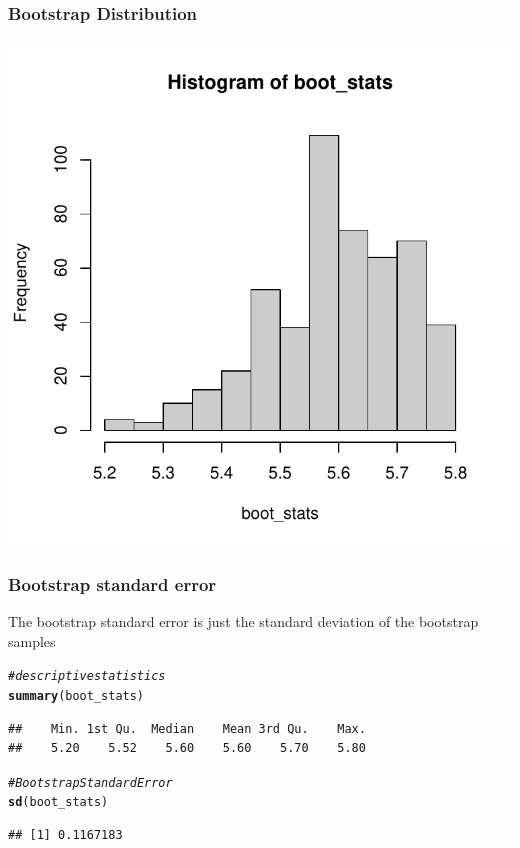 \documentclass[12pt]{beamer}\usepackage[]{graphicx}\usepackage[]{color}
\makeatletter
\newcommand{\hlcom}[1]{\textcolor[rgb]{0.678,0.584,0.686}{\textit{#1}}}%
\newcommand{\hlstd}[1]{\textcolor[rgb]{0.345,0.345,0.345}{#1}}%
\newcommand{\hlkwd}[1]{\textcolor[rgb]{0.737,0.353,0.396}{\textbf{#1}}}%
\newenvironment{kframe}{%
 \def\at@end@of@kframe{}%
 \ifinner\ifhmode%
  \def\at@end@of@kframe{\end{minipage}}%
  \begin{minipage}{\columnwidth}%
 \fi\fi%
 \def\FrameCommand##1{\hskip\@totalleftmargin \hskip-\fboxsep
 \colorbox{shadecolor}{##1}\hskip-\fboxsep
     \hskip-\linewidth \hskip-\@totalleftmargin \hskip\columnwidth}%
 \MakeFramed {\advance\hsize-\width
   \@totalleftmargin\z@ \linewidth\hsize
   \@setminipage}}%
 {\par\unskip\endMakeFramed%
 \at@end@of@kframe}
\newenvironment{knitrout}{}{} %
\makeatother
\begin{document}

\begin{frame}[fragile]
\frametitle{Bootstrap Distribution}

\begin{knitrout}\footnotesize
{}\color{fgcolor}

{\centering \includegraphics[width=.7\linewidth,height=.7\linewidth]{figure/unnamed-chunk-29-1} 

}



\end{knitrout}

\end{frame}


\begin{frame}[fragile]
\frametitle{Bootstrap standard error}

The bootstrap standard error is just the standard deviation of the bootstrap samples
\begin{knitrout}\footnotesize
{}\color{fgcolor}\begin{kframe}
\begin{alltt}
\hlcom{# descriptive statistics}
\hlkwd{summary}\hlstd{(boot_stats)}
\end{alltt}
\begin{verbatim}
##    Min. 1st Qu.  Median    Mean 3rd Qu.    Max. 
##    5.20    5.52    5.60    5.60    5.70    5.80
\end{verbatim}
\begin{alltt}
\hlcom{# Bootstrap Standard Error}
\hlkwd{sd}\hlstd{(boot_stats)}
\end{alltt}
\begin{verbatim}
## [1] 0.1167183
\end{verbatim}
\end{kframe}
\end{knitrout}

\end{frame}

\end{document}
